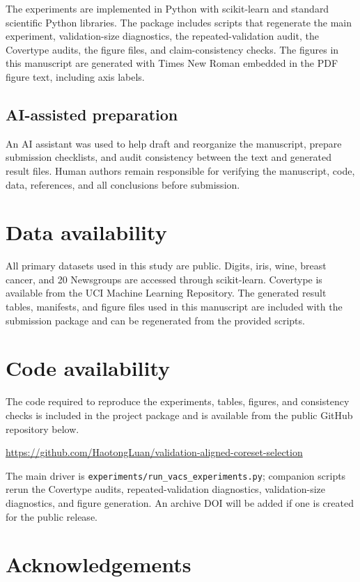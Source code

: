 \documentclass[12pt]{article}
\begin{document}
The experiments are implemented in Python with scikit-learn and standard scientific Python libraries. The package includes scripts that regenerate the main experiment, validation-size diagnostics, the repeated-validation audit, the Covertype audits, the figure files, and claim-consistency checks. The figures in this manuscript are generated with Times New Roman embedded in the PDF figure text, including axis labels.

\subsection*{AI-assisted preparation}

An AI assistant was used to help draft and reorganize the manuscript, prepare submission checklists, and audit consistency between the text and generated result files. Human authors remain responsible for verifying the manuscript, code, data, references, and all conclusions before submission.

\section*{Data availability}

All primary datasets used in this study are public. Digits, iris, wine, breast cancer, and 20 Newsgroups are accessed through scikit-learn. Covertype is available from the UCI Machine Learning Repository. The generated result tables, manifests, and figure files used in this manuscript are included with the submission package and can be regenerated from the provided scripts.

\section*{Code availability}

The code required to reproduce the experiments, tables, figures, and consistency checks is included in the project package and is available from the public GitHub repository below.

\url{https://github.com/HaotongLuan/validation-aligned-coreset-selection}

The main driver is \texttt{experiments/run\_vacs\_experiments.py}; companion scripts rerun the Covertype audits, repeated-validation diagnostics, validation-size diagnostics, and figure generation. An archive DOI will be added if one is created for the public release.

\section*{Acknowledgements}
\end{document}
